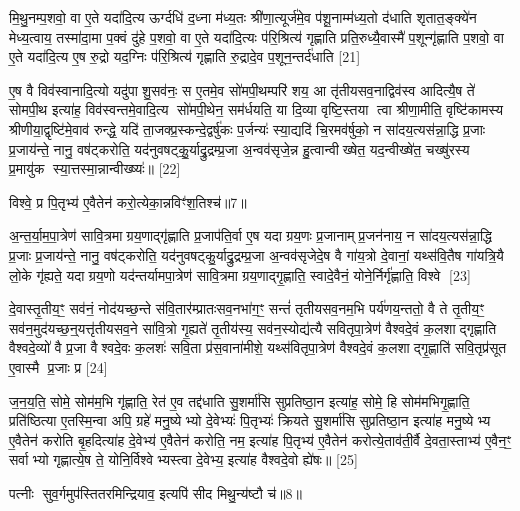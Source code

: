 मि॒थु॒नम्प॒शवो॒ वा ए॒ते यदा॑दि॒त्य ऊर्ग्दधि॑ द॒ध्ना म॑ध्य॒तः श्री॑णा॒त्यूर्ज॑मे॒व प॑शू॒नाम्म॑ध्य॒तो द॑धाति शृतात॒ङ्क्ये॑न मेध्य॒त्वाय॒ तस्मा॑दा॒मा प॒क्वं दु॑हे प॒शवो॒ वा ए॒ते यदा॑दि॒त्यः प॑रि॒श्रित्य॑ गृह्णाति प्रति॒रुध्यै॒वास्मै॑ प॒शून्गृ॑ह्णाति प॒शवो॒ वा ए॒ते यदा॑दि॒त्य ए॒ष रु॒द्रो यद॒ग्निः प॑रि॒श्रित्य॑ गृह्णाति रु॒द्रादे॒व प॒शून॒न्तर्द॑धाति [21]

ए॒ष वै विव॑स्वानादि॒त्यो यदु॑पाशु॒सव॑नः॒ स ए॒तमे॒व सो॑मपी॒थम्परि॑ शय॒ आ तृ॑तीयसव॒नाद्विव॑स्व आदित्यै॒ष ते॑ सोमपी॒थ इत्या॑ह॒ विव॑स्वन्तमे॒वादि॒त्य सो॑मपी॒थेन॒ सम॑र्धयति॒ या दि॒व्या वृष्टि॒स्तया त्वा श्रीणा॒मीति॒ वृष्टि॑कामस्य श्रीणीया॒द्वृष्टि॑मे॒वाव॑ रुन्द्धे॒ यदि॑ ता॒जक्प्र॒स्कन्दे॒द्वर्\mbox{}षु॑कः प॒र्जन्यः॑ स्या॒द्यदि॑ चि॒रमव॑र्\mbox{}षुको॒ न सा॑दय॒त्यस॑न्ना॒द्धि प्र॒जाः प्र॒जाय॑न्ते॒ नानु॒ वष॑ट्करोति॒ यद॑नुवषट्कु॒॒र्याद्रु॒द्रम्प्र॒जा अ॒न्वव॑सृजे॒न्न हु॒त्वान्वीख्षेत॒ यद॒न्वीख्षे॑त॒ चख्षु॑रस्य प्र॒मायु॑क स्या॒त्तस्मा॒न्नान्वीख्ष्यः॑॥ [22]

{\scriptsize {विश्वे॒ प्र पि॒तृभ्य॑ ए॒वैतेन॑ करो॒त्येका॒न्नविꣳ॑श॒तिश्च॑॥7॥}}

अ॒न्त॒र्या॒म॒पा॒त्रेण॑ सावि॒त्रमाग्रय॒णाद्गृ॑ह्णाति प्र॒जाप॑ति॒र्वा ए॒ष यदाग्रय॒णः प्र॒जानाम्प्र॒जन॑नाय॒ न सा॑दय॒त्यस॑न्ना॒द्धि प्र॒जाः प्र॒जाय॑न्ते॒ नानु॒ वष॑ट्करोति॒ यद॑नुवषट्कु॒र्याद्रु॒द्रम्प्र॒जा अ॒न्वव॑सृजेदे॒ष वै गा॑य॒त्रो दे॒वानां॒ यथ्स॑वि॒तैष गा॑यत्रि॒यै लो॒के गृ॑ह्यते॒ यदाग्रय॒णो यद॑न्तर्यामपा॒त्रेण॑ सावि॒त्रमाग्रय॒णाद्गृ॒ह्णाति॒ स्वादे॒वैनं॒ योने॒र्निर्गृ॑ह्णाति॒ विश्वे [23]

दे॒वास्तृ॒तीय॒ꣳ॒ सव॑नं॒ नोद॑यच्छ॒न्ते स॑वि॒तार॑म्प्रातःसव॒नभा॑ग॒ꣳ॒ सन्तं॑ तृतीयसव॒नम॒भि पर्य॑णय॒न्ततो॒ वै ते तृ॒तीय॒ꣳ॒ सव॑न॒मुद॑यच्छ॒न्॒यत्तृ॑तीयसव॒ने सा॑वि॒त्रो गृ॒ह्यते॑ तृ॒तीय॑स्य॒ सव॑न॒स्योद्य॑त्यै सवितृपा॒त्रेण॑ वैश्वदे॒वं क॒लशाद्गृह्णाति वैश्वदे॒व्यो॑ वै प्र॒जा वैश्वदे॒वः क॒लशः॑ सवि॒ता प्र॑स॒वाना॑मीशे॒ यथ्स॑वितृपा॒त्रेण॑ वैश्वदे॒वं क॒लशाद्गृ॒ह्णाति॑ सवि॒तृप्र॑सूत ए॒वास्मै प्र॒जाः प्र [24]

ज॒न॒य॒ति॒ सोमे॒ सोम॑म॒भि गृ॑ह्णाति॒ रेत॑ ए॒व तद्द॑धाति सु॒शर्मा॑सि सुप्रतिष्ठा॒न इत्या॑ह॒ सोमे॒ हि सोम॑मभिगृ॒ह्णाति॒ प्रति॑ष्ठित्या ए॒तस्मि॒न्वा अपि॒ ग्रहे॑ मनु॒ष्येभ्यो दे॒वेभ्यः॑ पि॒तृभ्यः॑ क्रियते सु॒शर्मा॑सि सुप्रतिष्ठा॒न इत्या॑ह मनु॒ष्येभ्य ए॒वैतेन॑ करोति बृ॒हदित्या॑ह दे॒वेभ्य॑ ए॒वैतेन॑ करोति॒ नम॒ इत्या॑ह पि॒तृभ्य॑ ए॒वैतेन॑ करोत्ये॒ताव॑ती॒र्वै दे॒वता॒स्ताभ्य॑ ए॒वैन॒ꣳ॒ सर्वाभ्यो गृह्णात्ये॒ष ते॒ योनि॒र्विश्वेभ्यस्त्वा दे॒वेभ्य॒ इत्या॑ह वैश्वदे॒वो ह्ये॑षः॥ [25]

{\scriptsize {पत्नीः सुव॒र्गमुप॑स्तितरमिन्द्रियाव॒ इत्यपि॑ सीद मिथु॒न्य॑ष्टौ च॑॥8॥}}


